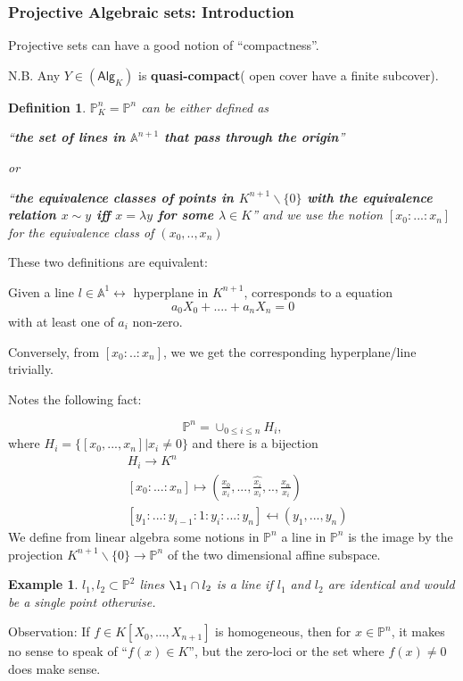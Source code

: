 \documentclass[11pt]{article}
\newtheorem{dfn}[thm]{Definition}
\newtheorem{ex}[thm]{Example}
\newcommand{\affn}{\mathbb A}
\newcommand{\proj}{\mathbb P}
\newcommand{\lrta}{\longrightarrow}
\newcommand{\llrta}{\longleftrightarrow}
\begin{document}
\subsubsection{Projective Algebraic sets: Introduction}

Projective sets can have a good notion of ``compactness''.

N.B. Any $Y\in (\mathsf{Alg}_K)$ is \textbf{quasi-compact}( open cover have a finite subcover).

\begin{dfn}
$\proj^n_K=\proj^n$ can be either defined as 

``\textbf{the set of  lines in $\affn^{n+1}$ that pass through the origin}''

or

``\textbf{the equivalence classes of points in $K^{n+1}\backslash \{0\}$ with the equivalence relation $x\sim y$ iff $x=\lambda y$ for some $\lambda \in K$}'' and we use the notion $[x_0:...:x_n]$ for the equivalence class of $(x_0,..,x_n)$
\end{dfn}

These two definitions are equivalent: 

Given a line $l\in \affn^1\llrta $ hyperplane in $K^{n+1}$, corresponds to a equation
$$
a_0X_0+....+a_n X_n=0
$$
with at least one of $a_i$ non-zero.

Conversely, from $[x_0:..:x_n]$, we  we get the corresponding hyperplane/line trivially.


Notes the following fact:

$$
\proj^n=\cup_{0\leq i\leq n} H_i,
$$
where $H_i=\{[x_0,...,x_n]|x_i\neq 0\}$ and there is a bijection 
$$
\begin{aligned}
&H_i\lrta K^n\\
&[x_0:...:x_n]\longmapsto\left(\frac{x_0}{x_i},...,\widehat{\frac{x_i}{x_i}},..,\frac{x_n}{x_i}\right)\\
&
[y_1:...:y_{i-1}:1:y_{i}:...:y_n]\mapsfrom(y_1,...,y_n)
\end{aligned}
$$
We define from linear algebra some notions in $\proj^n$ a line in $\proj^n$ is the image by the projection $K^{n+1}\backslash \{0\}\lrta \proj^n$ of the two dimensional affine subspace.

\begin{ex}
$l_1,l_2\subset \proj^2$ lines $\l_1\cap l_2$ is a line if $l_1$ and $l_2$ are identical and would be a single point otherwise.
\end{ex}

Observation: If $f\in K[X_0,...,X_{n+1}]$ is homogeneous, then for $x\in \proj^n$, it makes no sense to speak of ``$f(x)\in K$'', but the zero-loci or the set where $f(x)\neq 0$ does make sense.
\end{document}
